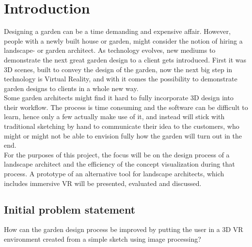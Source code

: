 \chapter{Introduction}
	Designing a garden can be a time demanding and expensive affair. However, people with a newly built house or garden, might consider the notion of hiring a landscape- or garden architect. As technology evolves, new mediums to demonstrate the next great garden design to a client gets introduced\cite{landscapeArchitectureDigiTech}. First it was 3D scenes, built to convey the design of the garden, now the next big step in technology is Virtual Reality\cite{VRS}, and with it comes the possibility to demonstrate garden designs to clients in a whole new way.\\
	
	Some garden architects might find it hard to fully incorporate 3D design into their workflow. The process is time consuming and the software can be difficult to learn, hence only a few actually make use of it, and instead will stick with traditional sketching by hand to communicate their idea to the customers, who might or might not be able to envision fully how the garden will turn out in the end.\\
	
	For the purposes of this project, the focus will be on the design process of a landscape architect and the efficiency of the concept visualization during that process. A prototype of an alternative tool for landscape architects, which includes immersive VR will be presented, evaluated and discussed.
	
	
	\section{Initial problem statement}
	How can the garden design process be improved by putting the user in a 3D VR environment created from a simple sketch using image processing?
	